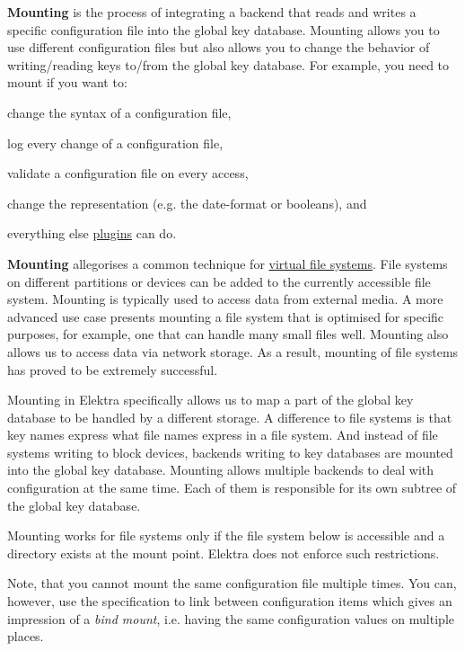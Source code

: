 {\bfseries Mounting} is the process of integrating a backend that reads and writes a specific configuration file into the global key database. Mounting allows you to use different configuration files but also allows you to change the behavior of writing/reading keys to/from the global key database. For example, you need to mount if you want to\+:


\begin{DoxyItemize}
\item change the syntax of a configuration file,
\item log every change of a configuration file,
\item validate a configuration file on every access,
\item change the representation (e.\+g. the date-\/format or booleans), and
\item everything else \hyperlink{md_src_plugins_README_src_plugins_README_md}{plugins} can do.
\end{DoxyItemize}

{\bfseries Mounting} allegorises a common technique for \hyperlink{doc_BIGPICTURE_md}{virtual file systems}. File systems on different partitions or devices can be added to the currently accessible file system. Mounting is typically used to access data from external media. A more advanced use case presents mounting a file system that is optimised for specific purposes, for example, one that can handle many small files well. Mounting also allows us to access data via network storage. As a result, mounting of file systems has proved to be extremely successful.

Mounting in Elektra specifically allows us to map a part of the global key database to be handled by a different storage. A difference to file systems is that key names express what file names express in a file system. And instead of file systems writing to block devices, backends writing to key databases are mounted into the global key database. Mounting allows multiple backends to deal with configuration at the same time. Each of them is responsible for its own subtree of the global key database.

Mounting works for file systems only if the file system below is accessible and a directory exists at the mount point. Elektra does not enforce such restrictions.

Note, that you cannot mount the same configuration file multiple times. You can, however, use the specification to link between configuration items which gives an impression of a {\itshape bind mount}, i.\+e. having the same configuration values on multiple places.


